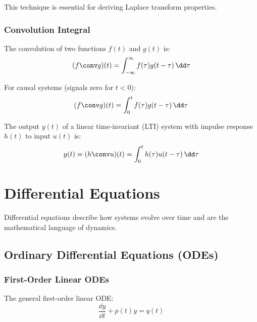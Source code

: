 This technique is essential for deriving Laplace transform properties.

\subsection{Convolution Integral}

The convolution of two functions $f(t)$ and $g(t)$ is:
\begin{equation}
(f \conv g)(t) = \int_{-\infty}^{\infty} f(\tau) g(t - \tau) \, \dd\tau
\end{equation}

For causal systems (signals zero for $t < 0$):
\begin{equation}
(f \conv g)(t) = \int_0^t f(\tau) g(t - \tau) \, \dd\tau
\end{equation}

\begin{keyconceptbox}[title=Convolution in Control Systems]
The output $y(t)$ of a linear time-invariant (LTI) system with impulse response $h(t)$ to input $u(t)$ is:
\begin{equation}
y(t) = (h \conv u)(t) = \int_0^t h(\tau) u(t - \tau) \, \dd\tau
\end{equation}
\end{keyconceptbox}

\chapter{Differential Equations}
\label{ch:diff_eq}

Differential equations describe how systems evolve over time and are the mathematical language of dynamics.

\section{Ordinary Differential Equations (ODEs)}

\subsection{First-Order Linear ODEs}

The general first-order linear ODE:
\begin{equation}
\frac{\dd y}{\dd t} + p(t) y = q(t)
\end{equation}

